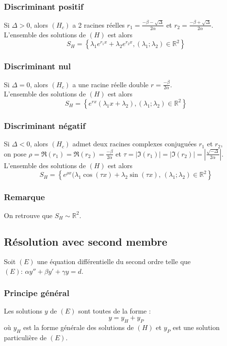 \documentclass[a4paper,10pt]{book} %
\newcommand{\R}{\mathbb{R}}
\begin{document}
\subsubsection{Discriminant positif}
Si $\Delta>0$, alors $(H_c)$ a 2 racines réelles $\displaystyle r_1=\frac{-\beta-\sqrt{\Delta}}{2\alpha}$ et $\displaystyle r_2=\frac{-\beta+\sqrt{\Delta}}{2\alpha}$.\\

L'ensemble des solutions de $(H)$ est alors $$S_H=\left\{ \lambda_1e^{r_1x}+\lambda_2e^{r_2x}, (\lambda_1;\lambda_2)\in\R^2 \right\}$$

\subsubsection{Discriminant nul}
Si $\Delta=0$, alors $(H_c)$ a une racine réelle double $\displaystyle r=\frac{-\beta}{2\alpha}$.\\

L'ensemble des solutions de $(H)$ est alors $$S_H=\left\{ e^{rx}(\lambda_1x+\lambda_2) , (\lambda_1;\lambda_2)\in\R^2 \right\}$$

\subsubsection{Discriminant négatif}
Si $\Delta<0$, alors $(H_c)$ admet deux racines complexes conjuguées $r_1$ et $r_2$,\\
on pose $\rho=\Re(r_1)=\Re(r_2)=\frac{-\beta}{2\alpha}$ et $\tau=|\Im(r_1)|=|\Im(r_2)|= |\frac{\sqrt{-\Delta}}{2\alpha}|$.\\

L'ensemble des solutions de $(H)$ est alors
$$S_H=\left\{ e^{\rho x}(\lambda_1\cos(\tau x)+\lambda_2\sin(\tau x)\text{, }(\lambda_1;\lambda_2)\in\R^2 \right\}$$

\subsubsection{Remarque}
On retrouve que $S_H \sim \R^2$.

\newpage

\subsection{Résolution avec second membre}
Soit $(E)$ une équation différentielle du second ordre telle que $(E)\text{: } \alpha y''+\beta y'+\gamma y=d$.

\subsubsection{Principe général}
Les solutions $y$ de $(E)$ sont toutes de la forme :
$$y=y_H+y_P$$
où $y_H$ est la forme générale des solutions de $(H)$ et $y_P$ est une solution particulière de $(E)$.
\end{document}
